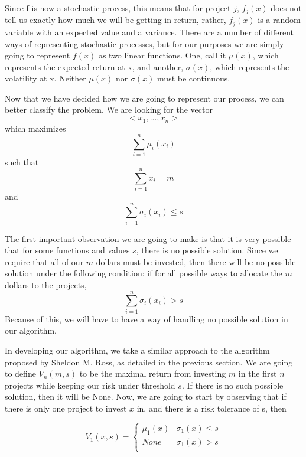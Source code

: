 \documentclass{article}
\begin{document}
\breakline
\par
Since f is now a stochastic process, this means that for project $j$,  $f_{j}(x)$ does not tell us exactly how much we will be getting in return, rather, $f_{j}(x)$ is a random variable with an expected value and a variance. There are a number of different ways of representing stochastic processes, but for our purposes we are simply going to represent $f(x)$ as two linear functions. One, call it $\mu(x)$, which represents the expected return at x, and another, $\sigma(x)$, which represents the volatility at x.  Neither $\mu(x)$ nor $\sigma(x)$ must be continuous.  
\newline
\par
Now that we have decided how we are going to represent our process, we can better classify the problem.  We are looking for the vector $$<x_{1},...,x_{n}>$$ which maximizes 
$$\sum_{i=1}^{n} \mu_{i}(x_{i})$$
such that
$$\sum_{i=1}^{n}x_{i} = m$$
and
$$\sum_{i=1}^{n} \sigma_{i}(x_{i}) \leq s$$
\newline
\par
The first important observation we are going to make is that it is very possible that for some functions and values $s$, there is no possible solution. Since we require that all of our $m$ dollars must be invested, then there will be no possible solution under the following condition:
\newline
if for all possible ways to allocate the $m$ dollars to the projects, 
$$\sum_{i=1}^{n} \sigma_{i}(x_{i}) > s$$
Because of this, we will have to have a way of handling no possible solution in our algorithm.  
\newline
\par
In developing our algorithm, we take a similar approach to the algorithm proposed by Sheldon M. Ross, as detailed in the previous section.
\newline
We are going to define $V_{n}(m, s)$ to be the maximal return from investing $m$ in the first $n$ projects while keeping our risk under threshold $s$.  If there is no such possible solution, then it will be None.
\newline
Now, we are going to start by observing that if there is only one project to invest $x$ in, and there is a risk tolerance of s, then 

\[V_{1}(x, s) =  \begin{cases} 
      \mu_{1}(x) & \sigma_{1}(x) \leq s \\
      None & \sigma_{1}(x) > s \\
   \end{cases}
\]
\end{document}
